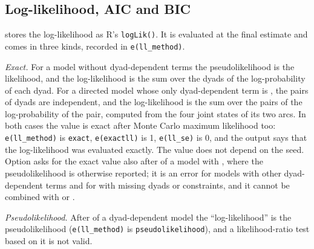 \subsection{Log-likelihood, AIC and BIC}\label{sec:loglik}

\nwergm{} stores the log-likelihood as R's \texttt{logLik()}. It is evaluated at the final estimate and comes in three kinds, recorded in \texttt{e(ll\_method)}.

\emph{Exact.} For a model without dyad-dependent terms the pseudolikelihood is the likelihood, and the log-likelihood is the sum over the dyads of the log-probability of each dyad. For a directed model whose only dyad-dependent term is , the pairs of dyads are independent, and the log-likelihood is the sum over the pairs of the log-probability of the pair, computed from the four joint states of its two arcs. In both cases the value is exact after Monte Carlo maximum likelihood too: \texttt{e(ll\_method)} is \texttt{exact}, \texttt{e(exactll)} is 1, \texttt{e(ll\_se)} is 0, and the output says that the log-likelihood was evaluated exactly. The value does not depend on the seed. Option  asks for the exact value also after  of a model with , where the pseudolikelihood is otherwise reported; it is an error for models with other dyad-dependent terms and for  with missing dyads or constraints, and it cannot be combined with  or .

\emph{Pseudolikelihood.} After  of a dyad-dependent model the ``log-likelihood'' is the pseudolikelihood (\texttt{e(ll\_method)} is \texttt{pseudolikelihood}), and a likelihood-ratio test based on it is not valid.

